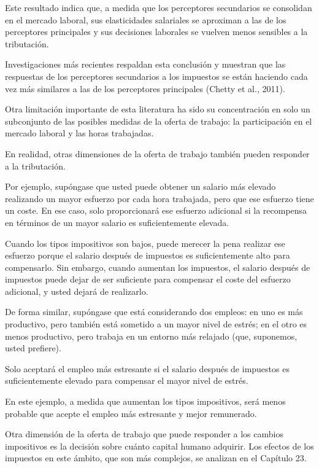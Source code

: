 \documentclass[10pt,a4paper]{article}
\begin{document}
Este resultado indica que, a medida que los perceptores secundarios se consolidan en el mercado laboral, sus elasticidades salariales se aproximan a las de los perceptores principales y sus decisiones laborales se vuelven menos sensibles a la tributación.

Investigaciones más recientes respaldan esta conclusión y muestran que las respuestas de los perceptores secundarios a los impuestos se están haciendo cada vez más similares a las de los perceptores principales (Chetty et al., 2011).

Otra limitación importante de esta literatura ha sido su concentración en solo un subconjunto de las posibles medidas de la oferta de trabajo: la participación en el mercado laboral y las horas trabajadas.

En realidad, otras dimensiones de la oferta de trabajo también pueden responder a la tributación.

Por ejemplo, supóngase que usted puede obtener un salario más elevado realizando un mayor esfuerzo por cada hora trabajada, pero que ese esfuerzo tiene un coste. En ese caso, solo proporcionará ese esfuerzo adicional si la recompensa en términos de un mayor salario es suficientemente elevada.

Cuando los tipos impositivos son bajos, puede merecer la pena realizar ese esfuerzo porque el salario después de impuestos es suficientemente alto para compensarlo. Sin embargo, cuando aumentan los impuestos, el salario después de impuestos puede dejar de ser suficiente para compensar el coste del esfuerzo adicional, y usted dejará de realizarlo.

De forma similar, supóngase que está considerando dos empleos: en uno es más productivo, pero también está sometido a un mayor nivel de estrés; en el otro es menos productivo, pero trabaja en un entorno más relajado (que, suponemos, usted prefiere).

Solo aceptará el empleo más estresante si el salario después de impuestos es suficientemente elevado para compensar el mayor nivel de estrés.

En este ejemplo, a medida que aumentan los tipos impositivos, será menos probable que acepte el empleo más estresante y mejor remunerado.

Otra dimensión de la oferta de trabajo que puede responder a los cambios impositivos es la decisión sobre cuánto capital humano adquirir. Los efectos de los impuestos en este ámbito, que son más complejos, se analizan en el Capítulo 23.
\end{document}
